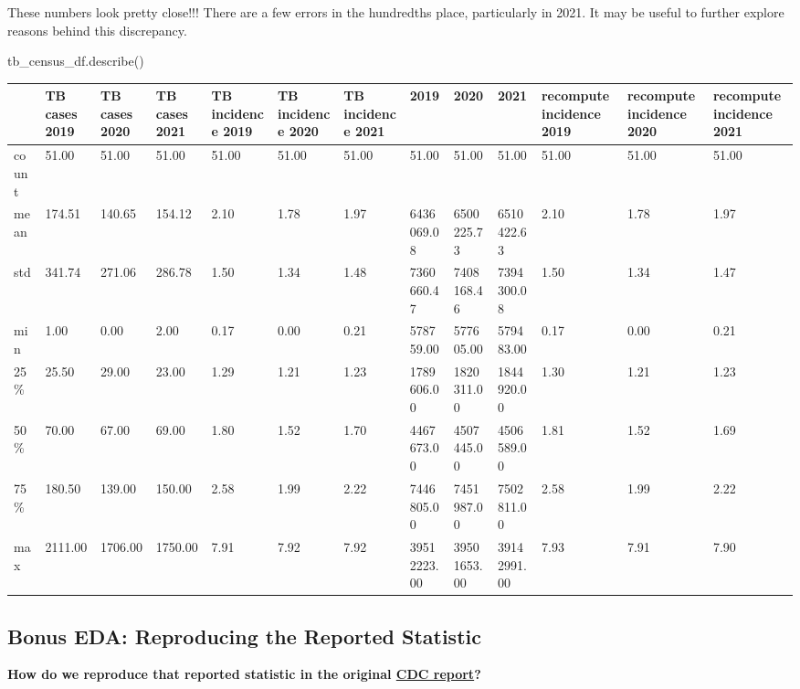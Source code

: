 \documentclass[
  letterpaper,
  DIV=11,
  numbers=noendperiod]{scrreprt}
\newenvironment{Shaded}{\begin{snugshade}}{\end{snugshade}}
\newcommand{\NormalTok}[1]{\textcolor[rgb]{0.00,0.23,0.31}{#1}}
\begin{document}
These numbers look pretty close!!! There are a few errors in the
hundredths place, particularly in 2021. It may be useful to further
explore reasons behind this discrepancy.

\begin{Shaded}
\begin{Highlighting}[]
\NormalTok{tb\_census\_df.describe()}
\end{Highlighting}
\end{Shaded}

\begin{longtable}[]{@{}lllllllllllll@{}}
\toprule\noalign{}
& TB cases 2019 & TB cases 2020 & TB cases 2021 & TB incidence 2019 & TB
incidence 2020 & TB incidence 2021 & 2019 & 2020 & 2021 & recompute
incidence 2019 & recompute incidence 2020 & recompute incidence 2021 \\
\midrule\noalign{}
\endhead
\bottomrule\noalign{}
\endlastfoot
count & 51.00 & 51.00 & 51.00 & 51.00 & 51.00 & 51.00 & 51.00 & 51.00 &
51.00 & 51.00 & 51.00 & 51.00 \\
mean & 174.51 & 140.65 & 154.12 & 2.10 & 1.78 & 1.97 & 6436069.08 &
6500225.73 & 6510422.63 & 2.10 & 1.78 & 1.97 \\
std & 341.74 & 271.06 & 286.78 & 1.50 & 1.34 & 1.48 & 7360660.47 &
7408168.46 & 7394300.08 & 1.50 & 1.34 & 1.47 \\
min & 1.00 & 0.00 & 2.00 & 0.17 & 0.00 & 0.21 & 578759.00 & 577605.00 &
579483.00 & 0.17 & 0.00 & 0.21 \\
25\% & 25.50 & 29.00 & 23.00 & 1.29 & 1.21 & 1.23 & 1789606.00 &
1820311.00 & 1844920.00 & 1.30 & 1.21 & 1.23 \\
50\% & 70.00 & 67.00 & 69.00 & 1.80 & 1.52 & 1.70 & 4467673.00 &
4507445.00 & 4506589.00 & 1.81 & 1.52 & 1.69 \\
75\% & 180.50 & 139.00 & 150.00 & 2.58 & 1.99 & 2.22 & 7446805.00 &
7451987.00 & 7502811.00 & 2.58 & 1.99 & 2.22 \\
max & 2111.00 & 1706.00 & 1750.00 & 7.91 & 7.92 & 7.92 & 39512223.00 &
39501653.00 & 39142991.00 & 7.93 & 7.91 & 7.90 \\
\end{longtable}

\subsection{Bonus EDA: Reproducing the Reported
Statistic}\label{bonus-eda-reproducing-the-reported-statistic}

\textbf{How do we reproduce that reported statistic in the original
\href{https://www.cdc.gov/mmwr/volumes/71/wr/mm7112a1.htm?s_cid=mm7112a1_w}{CDC
report}?}
\end{document}
